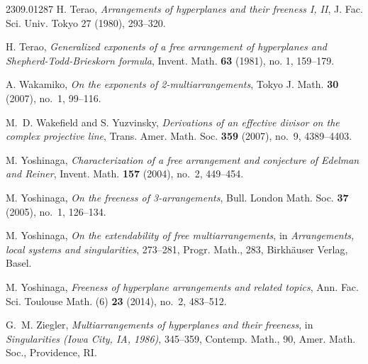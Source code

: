 \documentclass[12pt]{amsart}
\theoremstyle{definition}
\theoremstyle{remark}
\begin{document}
\begin{thebibliography}{2309.01287}
H. Terao, {\it Arrangements of hyperplanes and their freeness I, II}, J. Fac. Sci. Univ. Tokyo 27 (1980), 293–320.

 H. Terao, {\it Generalized exponents of a free arrangement of hyperplanes and Shepherd-Todd-Brieskorn formula}, Invent. Math. \textbf{63} (1981), no. 1, 159--179.

A. Wakamiko, {\it On the exponents of 2-multiarrangements}, Tokyo J. Math. {\bf 30} (2007), no.~1, 99--116.

M.~D. Wakefield and S. Yuzvinsky, {\it Derivations of an effective divisor on the complex projective line}, Trans. Amer. Math. Soc. {\bf 359} (2007), no.~9, 4389--4403.

M. Yoshinaga, {\it Characterization of a free arrangement and conjecture of Edelman and Reiner}, Invent. Math. {\bf 157} (2004), no.~2, 449--454.

M. Yoshinaga, {\it On the freeness of 3-arrangements}, Bull. London Math. Soc. {\bf 37} (2005), no.~1, 126--134.

M. Yoshinaga, {\it On the extendability of free multiarrangements}, in {\it Arrangements, local systems and singularities}, 273--281, Progr. Math., 283, Birkh\"auser Verlag, Basel.

M. Yoshinaga, {\it Freeness of hyperplane arrangements and related topics}, Ann. Fac. Sci. Toulouse Math. (6) {\bf 23} (2014), no.~2, 483--512.

G.~M. Ziegler, {\it Multiarrangements of hyperplanes and their freeness}, in {\it Singularities (Iowa City, IA, 1986)}, 345--359, Contemp. Math., 90, Amer. Math. Soc., Providence, RI.

\end{thebibliography}
\end{document}

